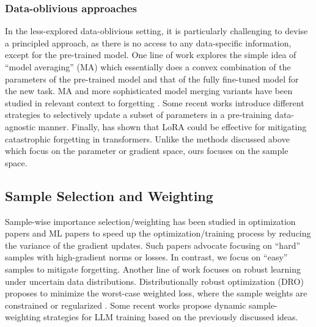 \subsubsection{Data-oblivious approaches}
In the less-explored data-oblivious setting, it is particularly challenging to devise a principled approach, as there is no access to any data-specific information, except for the pre-trained model. 
One line of work explores the simple idea of ``model averaging'' (MA) which essentially does a convex combination of the parameters of the pre-trained model and that of the fully fine-tuned model for the new task. 
MA and more sophisticated model merging variants have been studied in relevant context to forgetting \citep{lubana2021quadratic, wortsman2021robust, ilharco2023editing, lin2023mitigating, kleiman2025soupgomitigatingforgetting}. 
Some recent works \citep{chen2024mofo,panda2406lottery} introduce different strategies to selectively update a subset of parameters in a pre-training data-agnostic manner.
Finally, \citet{biderman2024lora} has shown that LoRA \cite{hu2022lora} could be effective for mitigating catastrophic forgetting in transformers. 
Unlike the methods discussed above which focus on the parameter or gradient space, ours focuses on the sample space.

\subsection{Sample Selection and Weighting}
Sample-wise importance selection/weighting has been studied in optimization papers \citep{needell2014stochastic, zhao2015stochastic, Alain2015VarianceRI, stich2017safe} and ML papers \citep{Loshchilov2015OnlineBS, shrivastava2016training, katharopoulos2017biased, katharopoulos2018not, kawaguchi2020ordered, dasunderstanding} to speed up the optimization/training process by reducing the variance of the gradient updates. 
Such papers advocate focusing on \enquote{hard} samples with high-gradient norms or losses. In contrast, we focus on \enquote{easy} samples to mitigate forgetting. Another line of work focuses on robust learning under uncertain data distributions. Distributionally robust optimization (DRO) proposes to minimize the worst-case weighted loss, where the sample weights are constrained or regularized \citep{ben2013robust,levy2020large,duchi2021learning,qi2021online}. 
Some recent works \citep{xie2024doremi,chen2024take,anonymous2025dynamic} propose dynamic sample-weighting strategies for LLM training based on the previously discussed ideas.